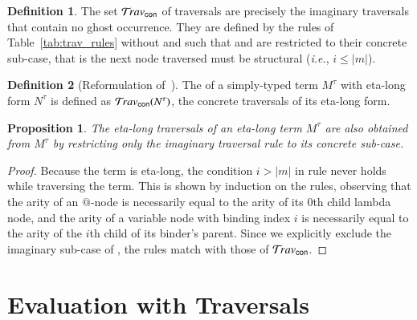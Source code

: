 \documentclass{elsarticle}
\makeatletter
\theoremstyle{plain}
\newtheorem{proposition}[theorem]{Proposition}
\theoremstyle{definition}
\newtheorem{definition}{Definition}[section]
\newcommand{\ghostvar}{\theta}
\newcommand{\concrete}{{\sf con}}
\renewcommand\ie{{\it i.e.\@\xspace}}
\makeatother
\begin{document}
\begin{definition}
    \label{def:concrete_traversals}
The set $\travset_\concrete$ of  traversals
are precisely the imaginary traversals that contain no ghost occurrence.
They are defined by the rules of Table~\ref{tab:trav_rules} without \rulenamet{Lam^\ghostvar} and such that  and  are restricted to their concrete sub-case, that is the next node traversed must be structural (\ie, $i\leq|m|$).

\end{definition}

\begin{definition}[Reformulation of~\cite{BlumPhd}]
The  of a simply-typed term $M^\tau$ with eta-long form $N^\tau$ is defined as $\travset_{\concrete}(N^\tau)$, the concrete traversals of its eta-long form.
\end{definition}

\begin{proposition}
\label{prop:ulc_and_stlc_trav_coincide}
The eta-long traversals of an eta-long term $M^\tau$ are also obtained from
$M^\tau$ by restricting only the imaginary traversal rule  to its concrete sub-case.
\end{proposition}
\begin{proof}
Because the term is eta-long, the condition $i>|m|$ in rule  never holds while traversing the term. This is shown by induction on the rules, observing that the arity of an $@$-node is necessarily equal to the arity of its $0$th child lambda node, and the arity of a variable node with binding index $i$ is necessarily equal to the arity of the $i$th child of its binder's parent.
Since we explicitly exclude the imaginary sub-case of , the rules match with those of $\travset_\concrete$.
\end{proof}


\section{Evaluation with Traversals}
\label{sec:normalizing_trav}
\end{document}
